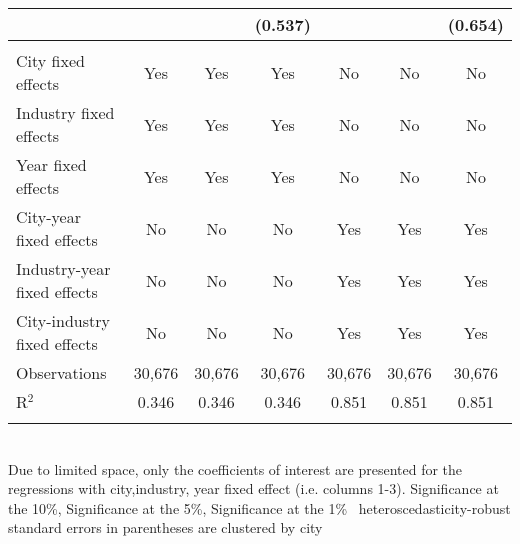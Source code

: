 \documentclass[12pt]{article}
\begin{document}
\begin{table}[!htbp]
\begin{adjustbox}{width=\textwidth, totalheight=\baselineskip,keepaspectratio}
\begin{tabular}{@{\extracolsep{5pt}}lcccccc}
  &  &  & (0.537) &  &  & (0.654) \\ 
 \hline \\[-1.8ex] 
City fixed effects & Yes & Yes & Yes & No & No & No \\ 
Industry fixed effects & Yes & Yes & Yes & No & No & No \\ 
Year fixed effects & Yes & Yes & Yes & No & No & No \\ 
City-year fixed effects & No & No & No & Yes & Yes & Yes \\ 
Industry-year fixed effects & No & No & No & Yes & Yes & Yes \\ 
City-industry fixed effects & No & No & No & Yes & Yes & Yes \\ 
Observations & 30,676 & 30,676 & 30,676 & 30,676 & 30,676 & 30,676 \\ 
R$^{2}$ & 0.346 & 0.346 & 0.346 & 0.851 & 0.851 & 0.851 \\ 
\hline 
\hline \\[-1.8ex] 
\end{tabular}
\end{adjustbox}
\begin{tablenotes} 
 \small 
 \item \\ 
\footnotesize{
Due to limited space, only the coefficients of interest are presented 
for the regressions with city,industry, year fixed effect (i.e. columns 1-3).
\sym{*} Significance at the 10\%, \sym{**} Significance at the 5\%, \sym{***} Significance at the 1\% \
heteroscedasticity-robust standard errors in parentheses are clustered by city 
}
 
\end{tablenotes}
\end{table}
\end{document}
